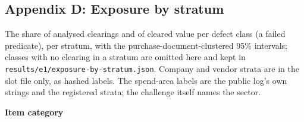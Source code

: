 \documentclass[
  10pt,
]{article}
\begin{document}
\hypertarget{appendix-d-exposure-by-stratum}{%
\subsection{Appendix D: Exposure by
stratum}\label{appendix-d-exposure-by-stratum}}

The share of analysed clearings and of cleared value per defect class (a
failed predicate), per stratum, with the purchase-document-clustered
95\% intervals; classes with no clearing in a stratum are omitted here
and kept in \texttt{results/e1/exposure-by-stratum.json}. Company and
vendor strata are in the slot file only, as hashed labels. The
spend-area labels are the public log's own strings and the registered
strata; the challenge itself names the sector.

\textbf{Item category}
\end{document}
